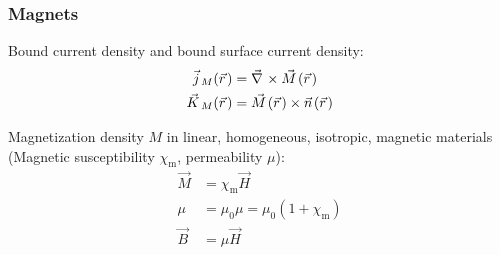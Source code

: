 		\subsubsection{Magnets}
			\noindent
			Bound current density and bound surface current density:
			\begin{equation}
				\begin{aligned}
					\vec{j}_M(\vec{r}) &= \Nabla\times\vec{M}(\vec{r}) \\
					\vec{K}_M(\vec{r}) &= \vec{M}(\vec{r})\times \vec{n}(\vec{r}) \\
				\end{aligned}
			\end{equation}

			\noindent
			Magnetization density $M$ in linear, homogeneous, isotropic, magnetic materials (Magnetic susceptibility $\chi_\text{m}$, permeability $\mu$):
			\begin{equation}
				\begin{aligned}
					\vec{M} &= \chi_\text{m}\vec{H} \\
					\mu &= \mu_0 \mu = \mu_0(1+\chi_\text{m}) \\
					\vec{B} &= \mu \vec{H} \\
				\end{aligned}
			\end{equation}
